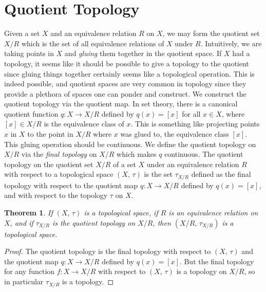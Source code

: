 \documentclass{article}
\theoremstyle{plain}
\newtheorem{theorem}{Theorem}[section]
\theoremstyle{normal}
\newenvironment{definition}{%
    \pushQED{\qed}\renewcommand{\qedsymbol}{$\blacksquare$}\definitionx%
}{%
    \popQED\enddefinitionx%
}
\begin{document}
    \section{Quotient Topology}
        Given a set $X$ and an equivalence relation $R$ on $X$, we may form
        the quotient set $X/R$ which is the set of all equivalence relations
        of $X$ under $R$. Intuitively, we are taking points in $X$ and
        \textit{gluing} them together in the quotient space. If $X$ had a
        topology, it seems like it should be possible to give a topology to
        the quotient since gluing things together certainly seems like a
        topological operation. This is indeed possible, and quotient spaces are
        very common in topology since they provide a plethora of spaces one
        can ponder and construct. We construct the quotient topology via the
        quotient map. In set theory, there is a canonical quotient function
        $q:X\rightarrow{X}/R$ defined by $q(x)=[x]$ for all $x\in{X}$, where
        $[x]\in{X}/R$ is the equivalence class of $x$. This is something like
        projecting points $x$ in $X$ to the point in $X/R$ where $x$ was glued
        to, the equivalence class $[x]$. This gluing operation should be
        continuous. We define the quotient topology on $X/R$ via the
        \textit{final topology} on $X/R$ which makes $q$ continuous.
        \begin{definition}[\textbf{Quotient Topology}]
            The quotient topology on the quotient set $X/R$ of a set $X$ under
            an equivalence relation $R$ with respect to a topological space
            $(X,\,\tau)$ is the set $\tau_{X/R}$ defined as the final topology
            with respect to the quotient map $q:X\rightarrow{X}/R$ defined
            by $q(x)=[x]$, and with respect to the topology $\tau$ on $X$.
        \end{definition}
        \begin{theorem}
            If $(X,\,\tau)$ is a topological space, if $R$ is an equivalence
            relation on $X$, and if $\tau_{X/R}$ is the quotient topology on
            $X/R$, then $(X/R,\,\tau_{X/R})$ is a topological space.
        \end{theorem}
        \begin{proof}
            The quotient topology is the final topology with respect to
            $(X,\,\tau)$ and the quotient map $q:X\rightarrow{X}/R$ defined by
            $q(x)=[x]$. But the final topology for any function
            $f:X\rightarrow{X}/R$ with respect to $(X,\,\tau)$ is a topology on
            $X/R$, so in particular $\tau_{X/R}$ is a topology.
        \end{proof}
\end{document}
